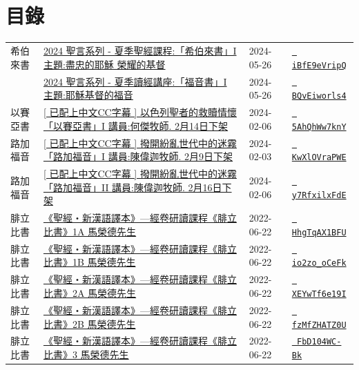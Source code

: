 \documentclass{book}
\begin{document}
\section{目錄}
\label{sec:index}
{ \scriptsize


\begin{xltabular}{\textwidth}{|p{0.15\textwidth} p{0.6\textwidth}|p{0.07\textwidth} p{0.1\textwidth}|}
\hline
希伯來書   & \hyperref[sec:iBfE9eVripQ]{2024 聖言系列 - 夏季聖經課程:「希伯來書」I 主題:盡忠的耶穌 榮耀的基督} & 2024-05-26 & \href{https://youtube.com/watch?v=iBfE9eVripQ}{\texttt{ iBfE9eVripQ}} \\
    & \hyperref[sec:BQvEiworls4]{2024 聖言系列 - 夏季讀經講座:「福音書」I 主題:耶穌基督的福音} & 2024-05-26 & \href{https://youtube.com/watch?v=BQvEiworls4}{\texttt{ BQvEiworls4}} \\
以賽亞書   & \hyperref[sec:5AhQhWw7knY]{[ 已配上中文CC字幕 ] 以色列聖者的救贖情懷「以賽亞書」I 講員:何傑牧師. 2月14日下架} & 2024-02-06 & \href{https://youtube.com/watch?v=5AhQhWw7knY}{\texttt{ 5AhQhWw7knY}} \\
路加福音   & \hyperref[sec:KwXlOVraPWE]{[ 已配上中文CC字幕 ] 撥開紛亂世代中的迷霧「路加福音」I  講員:陳偉迦牧師. 2月9日下架} & 2024-02-03 & \href{https://youtube.com/watch?v=KwXlOVraPWE}{\texttt{ KwXlOVraPWE}} \\
路加福音   & \hyperref[sec:y7RfxilxFdE]{[ 已配上中文CC字幕 ] 撥開紛亂世代中的迷霧「路加福音」II  講員:陳偉迦牧師. 2月16日下架} & 2024-02-06 & \href{https://youtube.com/watch?v=y7RfxilxFdE}{\texttt{ y7RfxilxFdE}} \\
腓立比書   & \hyperref[sec:HhgTqAX1BFU]{《聖經‧新漢語譯本》—經卷研讀課程《腓立比書》1A 馬榮德先生} & 2022-06-22 & \href{https://youtube.com/watch?v=HhgTqAX1BFU}{\texttt{ HhgTqAX1BFU}} \\
腓立比書   & \hyperref[sec:io2zo_oCeFk]{《聖經‧新漢語譯本》—經卷研讀課程《腓立比書》1B 馬榮德先生} & 2022-06-22 & \href{https://youtube.com/watch?v=io2zo_oCeFk}{\texttt{ io2zo\_oCeFk}} \\
腓立比書   & \hyperref[sec:XEYwTf6e19I]{《聖經‧新漢語譯本》—經卷研讀課程《腓立比書》2A 馬榮德先生} & 2022-06-22 & \href{https://youtube.com/watch?v=XEYwTf6e19I}{\texttt{ XEYwTf6e19I}} \\
腓立比書   & \hyperref[sec:fzMfZHATZ0U]{《聖經‧新漢語譯本》—經卷研讀課程《腓立比書》2B 馬榮德先生} & 2022-06-22 & \href{https://youtube.com/watch?v=fzMfZHATZ0U}{\texttt{ fzMfZHATZ0U}} \\
腓立比書   & \hyperref[sec:FbD104WC_Bk]{《聖經‧新漢語譯本》—經卷研讀課程《腓立比書》3 馬榮德先生} & 2022-06-22 & \href{https://youtube.com/watch?v=FbD104WC-Bk}{\texttt{ FbD104WC-Bk}} \\

\end{xltabular}}
\end{document}
